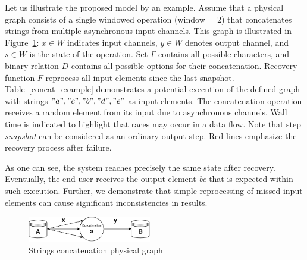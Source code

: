 Let us illustrate the proposed model by an example. Assume that a physical graph consists of a single windowed operation (window = 2) that concatenates strings from multiple asynchronous input channels. This graph is illustrated in Figure~\ref{concat}: $x \in W$ indicates input channels, $y\in W$ denotes output channel, and $ s \in W$ is the state of the operation. Set $\Gamma$ contains all possible characters, and binary relation $D$ contains all possible options for their concatenation. Recovery function $F$ reprocess all input elements since the last snapshot. Table~\ref{concat_example} demonstrates a potential execution of the defined graph with strings $"a","c","b","d","e"$ as input elements. The concatenation operation receives a random element from its input due to asynchronous channels. Wall time is indicated to highlight that races may occur in a data flow. Note that step {\em snapshot} can be considered as an ordinary output step. Red lines emphasize the recovery process after failure. 

As one can see, the system reaches precisely the same state after recovery. Eventually, the end-user receives the output element {\em be} that is expected within such execution. Further, we demonstrate that simple reprocessing of missed input elements can cause significant inconsistencies in results.



\begin{figure}[htbp]
  \centering
  \includegraphics[width=0.48\textwidth]{pics/concat}
  \caption{Strings concatenation physical graph}
  \label{concat}
\end{figure}

